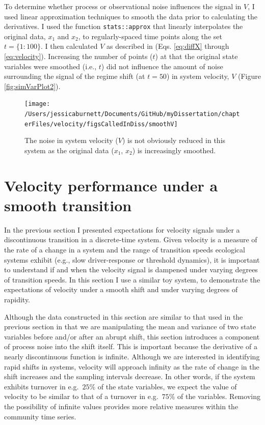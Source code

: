 \documentclass[12pt,twoside,openany]{reedthesis}
\begin{document}
To determine whether process or observational noise influences the signal in \(V\), I used linear approximation techniques to smooth the data prior to calculating the derivatives. I used the function \texttt{stats::approx} that linearly interpolates the original data, \(x_1\) and \(x_2\), to regularly-spaced time points along the set \(t=\{1:100\}\). I then calculated \(V\) as described in (Eqs. \eqref{eq:diffX} through \eqref{eq:velocity}). Increasing the number of points (\(t\)) at that the original state variables were smoothed (i.e., \(t\)) did not influence the amount of noise surrounding the signal of the regime shift (at \(t=50\)) in system velocity, \(V\) (Figure \ref{fig:simVarPlot2}).
\begin{figure}[bth]

{\centering \texttt{[image: /Users/jessicaburnett/Documents/GitHub/myDissertation/chapterFiles/velocity/figsCalledInDiss/smoothV]} 

}

\caption{The noise in system velocity ($V$) is not obviously reduced in this system as the original data ($x_1$, $x_2$) is increasingly smoothed.}\label{fig:smoothV}
\end{figure}
\hypertarget{velocity-performance-under-a-smooth-transition}{%
\section{Velocity performance under a smooth transition}\label{velocity-performance-under-a-smooth-transition}}

In the previous section I presented expectations for velocity signals under a discontinuous transition in a discrete-time system. Given velocity is a measure of the rate of a change in a system and the range of transition speeds ecological systems exhibit (e.g., slow driver-response or threshold dynamics), it is important to understand if and when the velocity signal is dampened under varying degrees of transition speeds. In this section I use a similar toy system, to demonstrate the expectations of velocity under a smooth shift and under varying degrees of rapidity.

Although the data constructed in this section are similar to that used in the previous section in that we are manipulating the mean and variance of two state variables before and/or after an abrupt shift, this section introduces a component of process noise into the shift itself. This is important because the derivative of a nearly discontinuous function is infinite. Although we are interested in identifying rapid shifts in systems, velocity will approach infinity as the rate of change in the shift increases and the sampling intervals decrease. In other words, if the system exhibits turnover in e.g.~\(25\%\) of the state variables, we expect the value of velocity to be similar to that of a turnover in e.g.~\(75\%\) of the variables. Removing the possibility of infinite values provides more relative measures within the community time series.
\end{document}
